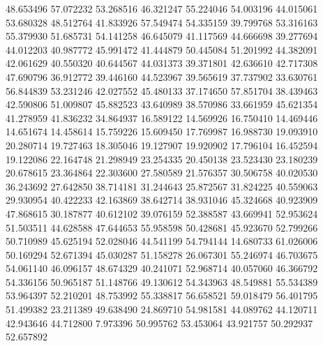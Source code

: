 48.653496
57.072232
53.268516
46.321247
55.224046
54.003196
44.015061
53.680328
48.512764
41.833926
57.549474
54.335159
39.799768
53.316163
55.379930
51.685731
54.141258
46.645079
41.117569
44.666698
39.277694
44.012203
40.987772
45.991472
41.444879
50.445084
51.201992
44.382091
42.061629
40.550320
40.644567
44.031373
39.371801
42.636610
42.717308
47.690796
36.912772
39.446160
44.523967
39.565619
37.737902
33.630761
56.844839
53.231246
42.027552
45.480133
37.174650
57.851704
38.439463
42.590806
51.009807
45.882523
43.640989
38.570986
33.661959
45.621354
41.278959
41.836232
34.864937
16.589122
14.569926
16.750410
14.469446
14.651674
14.458614
15.759226
15.609450
17.769987
16.988730
19.093910
20.280714
19.727463
18.305046
19.127907
19.920902
17.796104
16.452594
19.122086
22.164748
21.298949
23.254335
20.450138
23.523430
23.180239
20.678615
23.364864
22.303600
27.580589
21.576357
30.506758
40.020530
36.243692
27.642850
38.714181
31.244643
25.872567
31.824225
40.559063
29.930954
40.422233
42.163869
38.642714
38.931046
45.324668
40.923909
47.868615
30.187877
40.612102
39.076159
52.388587
43.669941
52.953624
51.503511
44.628588
47.644653
55.958598
50.428681
45.923670
52.799266
50.710989
45.625194
52.028046
44.541199
54.794144
14.680733
61.026006
50.169294
52.671394
45.030287
51.158278
26.067301
55.246974
46.703675
54.061140
46.096157
48.674329
40.241071
52.968714
40.057060
46.366792
54.336156
50.965187
51.148766
49.130612
54.343963
48.549881
55.534389
53.964397
52.210201
48.753992
55.338817
56.658521
59.018479
56.401795
51.499382
23.211389
49.638490
24.869710
54.981581
44.089762
44.120711
42.943646
44.712800
7.973396
50.995762
53.453064
43.921757
50.292937
52.657892
